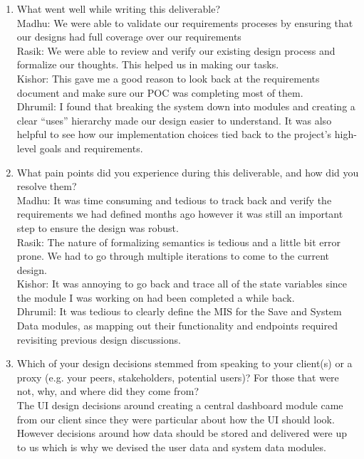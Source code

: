 \documentclass[12pt, titlepage]{article}
\begin{document}
\begin{enumerate}
  \item What went well while writing this deliverable? \\
    Madhu: We were able to validate our requirements proceses by ensuring that our designs had full coverage over our requirements\\
    Rasik: We were able to review and verify our existing design process and formalize our thoughts. This helped us in making our tasks. \\
    Kishor: This gave me a good reason to look back at the requirements document and make sure our POC was completing most of them.\\
    Dhrumil: I found that breaking the system down into modules and creating a clear “uses” hierarchy made our design easier to understand. It was also helpful to see how our implementation choices tied back to the project’s high-level goals and requirements. \\
  \item What pain points did you experience during this deliverable, and how
    did you resolve them?\\
    Madhu: It was time consuming and tedious to track back and verify the requirements we had defined months ago however it was still an important step to ensure the design was robust. \\
    Rasik: The nature of formalizing semantics is tedious and a little bit error prone. We had to go through multiple iterations to come to the current design. \\
    Kishor: It was annoying to go back and trace all of the state variables since the module I was working on had been completed a while back.\\
    Dhrumil: It was tedious to clearly define the MIS for the Save and System Data modules, as mapping out their functionality and endpoints required revisiting previous design discussions. \\
  \item Which of your design decisions stemmed from speaking to your client(s)
  or a proxy (e.g. your peers, stakeholders, potential users)? For those that
  were not, why, and where did they come from? \\
  The UI design decisions around creating a central dashboard module came from our client since they were particular about how the UI should look. However decisions around how data should be stored and delivered were up to us which is why we devised the user data and system data modules. 

\end{enumerate}
\end{document}
